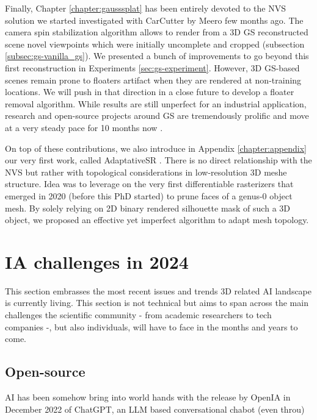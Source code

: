 Finally, Chapter \ref{chapter:gausssplat} has been entirely devoted to the \ac{NVS} solution we started investigated with CarCutter by Meero few months ago. The camera spin stabilization algorithm allows to render from a 3D \ac{GS} reconstructed scene novel viewpoints which were initially uncomplete and cropped (subsection \ref{subsec:gs-vanilla_gs}). We presented a bunch of improvements to go beyond this first reconstruction in Experiments \ref{sec:gs-experiment}. However, 3D \ac{GS}-based scenes remain prone to floaters artifact when they are rendered at non-training locations. We will push in that direction in a close future to develop a floater removal algorithm. While results are still unperfect for an industrial application, research and open-source projects around \ac{GS} \citep{kerbl20233d} are tremendously prolific and move at a very steady pace for 10 months now \citep{luiten2023dynamic,yang2024gaussianobject,wewer24latentsplat}. 

On top of these contributions, we also introduce in Appendix \ref{chapter:appendix} our very first work, called AdaptativeSR \citep{landreau2022adaptativesr}. There is no direct relationship with the \ac{NVS} but rather with topological considerations in low-resolution 3D meshe structure. Idea was to leverage on the very first differentiable rasterizers that emerged in 2020 \citep{liu2019soft} (before this PhD started) to prune faces of a genus-0 object mesh. By solely relying on 2D binary rendered silhouette mask of such a 3D object, we proposed an effective yet imperfect algorithm to adapt mesh topology. 

\section{IA challenges in 2024}

This section embrasses the most recent issues and trends 3D related \ac{AI} landscape is currently living. This section is not technical but aims to span across the main challenges the scientific community - from academic researchers to tech companies -, but also individuals, will have to face in the months and years to come. 

\subsection{Open-source}
\ac{AI} has been somehow bring into world hands with the release by OpenIA in December 2022 of ChatGPT, an \ac{LLM} based conversational chabot (even throu)

